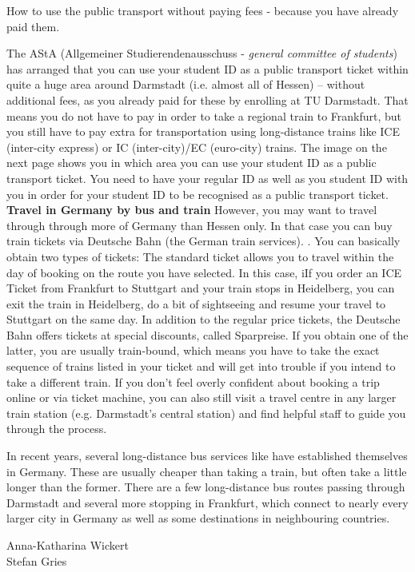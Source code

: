 {}
{How to use the public transport without paying fees - because you have already paid them.}
{The AStA (Allgemeiner Studierendenausschuss - \textit{general committee of students}) has arranged that you can use your student ID as a public transport ticket within quite a huge area around Darmstadt (i.e. almost all of Hessen) -- without additional fees, as you already paid for these by enrolling at TU Darmstadt.
That means you do not have to pay in order to take a regional train to Frankfurt, but you still have to pay extra for transportation using long-distance trains like ICE (inter-city express) or IC (inter-city)/EC (euro-city) trains.
The image on the next page shows you in which area you can use your student ID as a public transport ticket.
You need to have your regular ID as well as you student ID with you in order for your student ID to be recognised as a public transport ticket.\\

\noindent\textbf{Travel in Germany by bus and train}
However, you may want to travel through through more of Germany than Hessen only.
In that case you can buy train tickets via Deutsche Bahn (the German train services). \footnotemark[1].
You can basically obtain two types of tickets:
The standard ticket allows you to travel within the day of booking on the route you have selected.
In this case, iIf you order an ICE Ticket from Frankfurt to Stuttgart and your train stops in Heidelberg, you can exit the train in Heidelberg, do a bit of sightseeing and resume your travel to Stuttgart on the same day.
In addition to the regular price tickets, the Deutsche Bahn offers tickets at special discounts, called Sparpreise.
If you obtain one of the latter, you are usually train-bound, which means you have to take the exact sequence of trains listed in your ticket and will get into trouble if you intend to take a different train.
If you don't feel overly confident about booking a trip online or via ticket machine, you can also still visit a travel centre in any larger train station (e.g. Darmstadt's central station) and find helpful staff to guide you through the process.

In recent years, several long-distance bus services like \footnotemark[2] \footnotemark[3] have established themselves in Germany.
These are usually cheaper than taking a train, but often take a little longer than the former.
There are a few long-distance bus routes passing through Darmstadt and several more stopping in Frankfurt, which connect to nearly every larger city in Germany as well as some destinations in neighbouring countries.
}
{Anna-Katharina Wickert\\Stefan Gries}


\newpage
